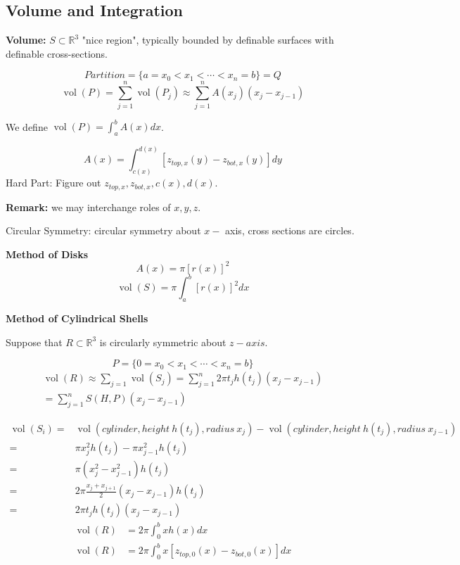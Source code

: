 \documentclass[12pt]{article}
\theoremstyle{plain}
\newcommand{\mR}{{\mathbb{R}}}
\DeclareMathOperator{\Vol}{vol}
\begin{document}

	\newpage
	\subsection{Volume and Integration}
	\textbf{Volume: }$S \subset \mR^3$ "nice region", typically bounded by
	definable surfaces with definable cross-sections. 

	\[
		Partition = \{a = x_0 < x_1 < \cdots < x_n = b\} = Q 
	\]	
	\[
		\Vol(P) = \sum_{j=1}^n \Vol(P_j) \approx 
		\sum_{j=1}^n A(x_j)(x_j-x_{j-1})
	\]
	
	We define $\Vol(P) = \int_a^b A(x)dx$. 

	\[
		A(x) = \int_{c(x)}^{d(x)}[z_{top, x}(y) - z_{bot, x}(y)]dy
	\]
	Hard Part: Figure out $z_{top, x}, z_{bot, x}, c(x), d(x)$. 

	\textbf{Remark:} we may interchange roles of $x,y,z$. 

	Circular Symmetry: circular symmetry about $x-$ axis, cross sections are 
	circles. 
	
	\textbf{Method of Disks}
	\[
		A(x) = \pi[r(x)]^2
	\]
	\[
		\Vol(S) = \pi\int_a^b [r(x)]^2 dx
	\]

	\textbf{Method of Cylindrical Shells}

	Suppose that $R\subset \mR^3$ is circularly symmetric about $z-axis$. 

	\[
		P = \{0 = x_0 < x_1 < \cdots < x_n = b\}
	\]
	\begin{align*}
		\Vol(R) \approx \sum_{j=1} \Vol(S_j)
		= \sum_{j=1}^n 2\pi t_j h(t_j) (x_j-x_{j-1})\\
		= \sum_{j=1}^n S(H,P) (x_j-x_{j-1})
	\end{align*}
	
	\begin{align*}
		\Vol(S_i) 
		=& \Vol(cylinder, height\  h(t_j), radius \ x_j)
		- \Vol(cylinder, height\ h(t_j), radius \ x_{j-1})\\
		=& \pi x^2_j h(t_j) - \pi x^2_{j-1}h(t_j)\\
		=& \pi(x^2_j-x^2_{j-1})h(t_j)\\
		=& 2\pi \frac{x_j+x_{j+1}}2 (x_j-x_{j-1}) h(t_j)\\
		=& 2\pi t_jh(t_j)(x_j-x_{j-1})
	\end{align*}
	\begin{align*}
		\Vol (R) &= 2\pi \int_0^b xh(x)dx\\
		\Vol (R) &= 2\pi \int_0^b x[z_{top, 0} (x) - z_{bot, 0}(x)]dx
	\end{align*}
%
\end{document}
